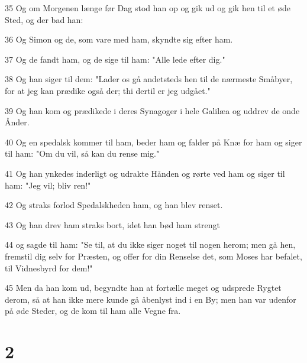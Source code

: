 \par 35 Og om Morgenen længe før Dag stod han op og gik ud og gik hen til et øde Sted, og der bad han:
\par 36 Og Simon og de, som vare med ham, skyndte sig efter ham.
\par 37 Og de fandt ham, og de sige til ham: "Alle lede efter dig."
\par 38 Og han siger til dem: "Lader os gå andetsteds hen til de nærmeste Småbyer, for at jeg kan prædike også der; thi dertil er jeg udgået."
\par 39 Og han kom og prædikede i deres Synagoger i hele Galilæa og uddrev de onde Ånder.
\par 40 Og en spedalsk kommer til ham, beder ham og falder på Knæ for ham og siger til ham: "Om du vil, så kan du rense mig."
\par 41 Og han ynkedes inderligt og udrakte Hånden og rørte ved ham og siger til ham: "Jeg vil; bliv ren!"
\par 42 Og straks forlod Spedalskheden ham, og han blev renset.
\par 43 Og han drev ham straks bort, idet han bød ham strengt
\par 44 og sagde til ham: "Se til, at du ikke siger noget til nogen herom; men gå hen, fremstil dig selv for Præsten, og offer for din Renselse det, som Moses har befalet, til Vidnesbyrd for dem!"
\par 45 Men da han kom ud, begyndte han at fortælle meget og udsprede Rygtet derom, så at han ikke mere kunde gå åbenlyst ind i en By; men han var udenfor på øde Steder, og de kom til ham alle Vegne fra.

\chapter{2}

